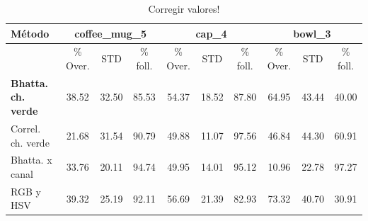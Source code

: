 \begin{table}[h]
\scriptsize
    \begin{tabular}{|l|*{3}{c|}*{3}{c|}*{3}{c|}}
        \hline 
    Método & \multicolumn{3}{|c|}{coffee\_mug\_5} & \multicolumn{3}{|c|}{cap\_4} & \multicolumn{3}{|c|}{bowl\_3}\\
    \hline 
                         & \% Over. & STD & \% foll. & \% Over. & STD & \% foll. & \% Over. & STD & \% foll. \\
    \hline
    \textbf{Bhatta. ch. verde} & 38.52 & 32.50 & 85.53 & 54.37 & 18.52 & 87.80 & 64.95 & 43.44 & 40.00\\
    \hline
    Correl. ch. verde          & 21.68 & 31.54 & 90.79 & 49.88 & 11.07 & 97.56 & 46.84 & 44.30 & 60.91\\
    \hline
    Bhatta. x canal            & 33.76 & 20.11 & 94.74 & 49.95 & 14.01 & 95.12 & 10.96 & 22.78 & 97.27\\
    \hline
    RGB y HSV                  & 39.32 & 25.19 & 92.11 & 56.69 & 21.39 & 82.93 & 73.32 & 40.70 & 30.91\\
    \hline
    \end{tabular}
\caption{Corregir valores!}
\end{table}